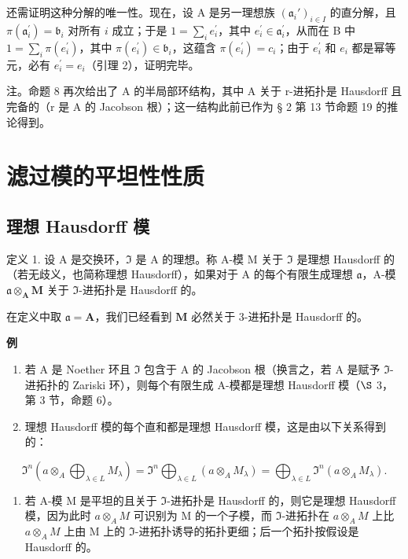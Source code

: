 还需证明这种分解的唯一性。现在，设 A 是另一理想族 \((\mathfrak{a}_i')_{i\in I}\) 的直分解，且 \(\pi (\mathfrak{a}_i^{\prime}) = \mathfrak{b}_i\) 对所有 \(i\) 成立；于是 \(1 = \sum_{i}e_{i}^{\prime}\)，其中 \(e_i^\prime \in \mathfrak{a}_i^\prime\)，从而在 B 中 \(1 = \sum_{i}\pi (e_i^{\prime})\)，其中 \(\pi (e_i^{\prime})\in \mathfrak{b}_i\)，这蕴含 \(\pi (e_i^{\prime}) = c_i\)；由于 \(e_i^\prime\) 和 \(e_i\) 都是幂等元，必有 \(e_i^\prime = e_i\)（引理 2），证明完毕。

注。命题 8 再次给出了 A 的半局部环结构，其中 A 关于 r-进拓扑是 Hausdorff 且完备的（r 是 A 的 Jacobson 根）；这一结构此前已作为 § 2 第 13 节命题 19 的推论得到。

\section{滤过模的平坦性性质}

\subsection{理想 Hausdorff 模}

定义 1. 设 A 是交换环，\(\mathfrak{I}\) 是 A 的理想。称 A-模 M 关于 \(\mathfrak{I}\) 是理想 Hausdorff 的（若无歧义，也简称理想 Hausdorff），如果对于 A 的每个有限生成理想 \(\mathfrak{a}\)，A-模 \(\mathfrak{a} \otimes_{\mathbf{A}} \mathbf{M}\) 关于 \(\mathfrak{I}\)-进拓扑是 Hausdorff 的。

在定义中取 \(\mathfrak{a} = \mathbf{A}\)，我们已经看到 \(\mathbf{M}\) 必然关于 3-进拓扑是 Hausdorff 的。

\textbf{例}\par

\begin{enumerate}
\def\labelenumi{(\arabic{enumi})}
\item
  若 A 是 Noether 环且 \(\mathfrak{I}\) 包含于 A 的 Jacobson 根（换言之，若 A 是赋予 \(\mathfrak{I}\)-进拓扑的 Zariski 环），则每个有限生成 A-模都是理想 Hausdorff 模（\(\S\) 3，第 3 节，命题 6）。
\item
  理想 Hausdorff 模的每个直和都是理想 Hausdorff 模，这是由以下关系得到的：
\end{enumerate}

\[
\Im^ {n} \left(a \otimes_ {A} \bigoplus_ {\lambda \in L} M _ {\lambda}\right) = \Im^ {n} \bigoplus_ {\lambda \in L} (a \otimes_ {A} M _ {\lambda}) = \bigoplus_ {\lambda \in L} \Im^ {n} (a \otimes_ {A} M _ {\lambda}).
\]

\begin{enumerate}
\def\labelenumi{(\arabic{enumi})}
\setcounter{enumi}{2}
\tightlist
\item
  若 A-模 M 是平坦的且关于 \(\Im\)-进拓扑是 Hausdorff 的，则它是理想 Hausdorff 模，因为此时 \(a \otimes_{A} M\) 可识别为 M 的一个子模，而 \(\Im\)-进拓扑在 \(a \otimes_{A} M\) 上比 \(a \otimes_{A} M\) 上由 M 上的 \(\Im\)-进拓扑诱导的拓扑更细；后一个拓扑按假设是 Hausdorff 的。
\end{enumerate}

